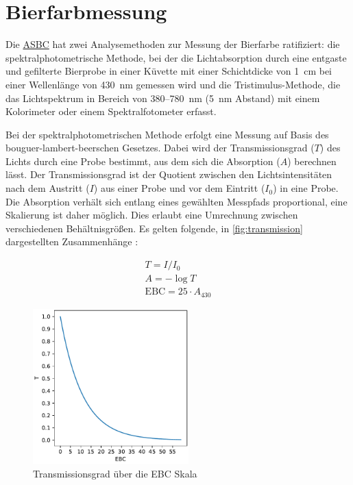 \documentclass[10pt,a4paper,DIV=12,parskip=half]{scrarticle}
\begin{document}
\section*{Bierfarbmessung}

Die \href{https://www.asbcnet.org}{ASBC} hat zwei Analysemethoden zur Messung der Bierfarbe ratifiziert: die spektralphotometrische Methode, bei der die Lichtabsorption durch eine entgaste und gefilterte Bierprobe in einer Küvette mit einer Schichtdicke von 1~cm bei einer Wellenlänge von 430~nm gemessen wird und die Tristimulus-Methode, die das Lichtspektrum in Bereich von 380--780~nm (5~nm Abstand) mit einem Kolorimeter oder einem Spektralfotometer erfasst. \autocite{ASBC2011}

Bei der spektralphotometrischen Methode erfolgt eine Messung auf Basis des bouguer-lambert-beerschen Gesetzes. Dabei wird der Transmissionsgrad ($T$) des Lichts durch eine Probe bestimmt, aus dem sich die Absorption ($A$) berechnen lässt. Der Transmissionsgrad ist der Quotient zwischen den Lichtsintensitäten nach dem Austritt ($I$) aus einer Probe und vor dem Eintritt ($I_0$) in eine Probe. Die Absorption verhält sich entlang eines gewählten Messpfads proportional, eine Skalierung ist daher möglich. Dies erlaubt eine Umrechnung zwischen verschiedenen Behältnisgrößen. Es gelten folgende, in \autoref{fig:transmission} dargestellten Zusammenhänge \autocite{deLange2016}:

\begin{equation*}
	\begin{gathered}
		T =  I / I_0 \\
		A = -\log T \\		
		\textrm{EBC} = 25 \cdot A_{430}
	\end{gathered}
\end{equation*}

\begin{figure}[H]
	\centering
	\includegraphics[width=6cm]{transmission.pdf}
	\caption{Transmissionsgrad über die EBC Skala}
	\label{fig:transmission}
\end{figure}
\end{document}
